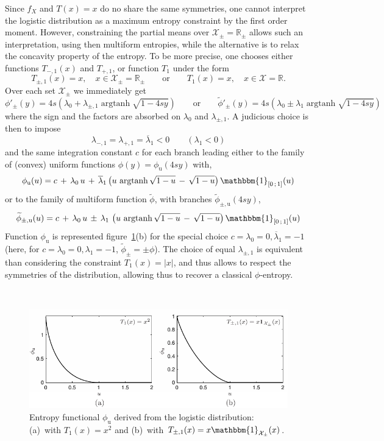 \documentclass[english,sort&compress]{elsarticle}
\theoremstyle{definition}
\theoremstyle{plain}
\theoremstyle{plain}
\def\Rset{\mathbb{R}}
\def\X{\mathcal{X}}
\def\un{\mathbbm{1}}
\def\argtanh{\operatorname{argtanh}}
\begin{document}
Since $f_X$ and $T(x) = x$ do no share the same symmetries, one cannot interpret
the logistic  distribution as  a maximum entropy  constraint by the  first order
moment. However,  constraining the partial  means over $\X_\pm  = \Rset_\pm$
allows  such  an  interpretation,  using  then multiform  entropies,  while  the
alternative  is to  relax the  concavity  property of  the entropy.  To be  more
precise, one  chooses either functions $T_{-,1}(x)$ and  $T_{+,1}$, or function
$T_1$ under the form
%
\[
T_{\pm,1}(x) = x, \quad x \in  \X_\pm = \Rset_\pm \qquad \mbox{or} \qquad T_1(x)
= x,\quad x \in \X = \Rset.
\]
%
Over each set $\X_\pm$ we immediately get 
%
\[
\phi'_\pm(y)  = 4  s \left(  \lambda_0 +  \lambda_{\pm,1} \argtanh\sqrt{1-4sy}
\right)  \qquad  \mbox{or}  \qquad   \widetilde{\phi}'_\pm(y)  =  4  s  \left(
  \lambda_0 \pm \lambda_1 \argtanh\sqrt{1-4sy} \right)
\]
%
where   the   sign  and   the   factors   are   absorbed  on   $\lambda_0$   and
$\lambda_{\pm,1}$. A judicious choice is then to impose
%
\[
\lambda_{-,1} = \lambda_{+,1} = \overline{\lambda}_1 < 0 \qquad (\lambda_1 < 0)
\]
%
and the  same integration constant  $c$ for each  branch leading either  to the
family of (convex) uniform functions $\phi(y) = \phi_{\mathrm{u}}(4 s y)$ with,
%
\[
\phi_{\mathrm{u}}(u) =  c \, +  \, \lambda_0 \,  u \, +  \, \overline{\lambda}_1
\left( u \, \argtanh\sqrt{1-u} \, -  \, \sqrt{1-u} \right) \un_{\left[ 0 \, ; \,
    1 \right]}(u)
\]
%
or  to  the  family  of  multiform function  $\widetilde{\phi}$,  with  branches
$\widetilde{\phi}_{\pm,\mathrm{u}}(4 s y)$,
%
\[
\widetilde{\phi}_{\pm,\mathrm{u}}(u)  = c  \,  + \,  \lambda_0  \, u  \, \pm  \,
\lambda_1  \,  \left(  u  \,  \argtanh\sqrt{1-u}  \,  -  \,  \sqrt{1-u}  \right)
\un_{\left[ 0 \, ; \, 1 \right]}(u)
\]
%
Function $\phi_{\mathrm{u}}$ is represented figure~\ref{fig:Entropy-logistic}(b)
for the special choice $c = \lambda_0 = 0, \overline{\lambda}_1 = -1$ (here, for
$c =  \lambda_0 = 0, \lambda_1  = -1$, $\widetilde{\phi}_\pm =  \pm \phi$).  The
choice of equal $\lambda_{\pm,1}$  is equivalent than considering the constraint
$T_1(x) = |x|$,  and thus allows to respect the  symmetries of the distribution,
allowing thus to recover a classical $\phi$-entropy.

\

\begin{figure}[htbp]
\centerline{\includegraphics[width=.9\textwidth]{PDF/MaxEnt_LogisticLaw}}
\caption{Entropy  functional  $\phi_{\mathrm{u}}$   derived  from  the  logistic
  distribution:  (a)~with  $T_1(x)  =   x^2$  and  (b)~with  $T_{\pm,1}(x)  =  x
  \un_{\X_\pm}(x)$.}
\label{fig:Entropy-logistic}
\end{figure}
\end{document}
